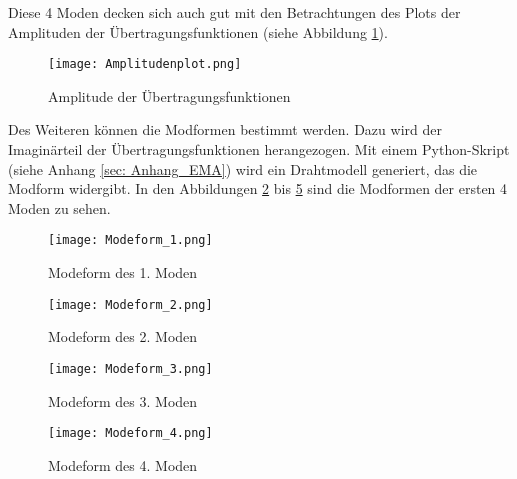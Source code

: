    \noindent
    Diese 4 Moden decken sich auch gut mit den Betrachtungen des Plots der
    Amplituden der Übertragungsfunktionen (siehe Abbildung
    \ref{fig: Amplitudenplot}).

    \begin{figure}[H]
        \centering
        \texttt{[image: Amplitudenplot.png]}
        \caption{Amplitude der Übertragungsfunktionen}
        \label{fig: Amplitudenplot}
    \end{figure}

    \noindent
    Des Weiteren können die Modformen bestimmt werden. Dazu wird der
    Imaginärteil der Übertragungsfunktionen herangezogen. Mit einem
    Python-Skript (siehe Anhang \ref{sec: Anhang_EMA}) wird ein Drahtmodell
    generiert, das die Modform widergibt. In den Abbildungen
    \ref{fig: Modeform_1} bis \ref{fig: Modeform_4} sind die Modformen
    der ersten 4 Moden zu sehen.

    \begin{figure}[H]
        \centering
        \texttt{[image: Modeform\_1.png]}
        \caption{Modeform des 1. Moden}
        \label{fig: Modeform_1}
    \end{figure}

    \begin{figure}[H]
        \centering
        \texttt{[image: Modeform\_2.png]}
        \caption{Modeform des 2. Moden}
        \label{fig: Modeform_2}
    \end{figure}

    \begin{figure}[H]
        \centering
        \texttt{[image: Modeform\_3.png]}
        \caption{Modeform des 3. Moden}
        \label{fig: Modeform_3}
    \end{figure}

    \begin{figure}[H]
        \centering
        \texttt{[image: Modeform\_4.png]}
        \caption{Modeform des 4. Moden}
        \label{fig: Modeform_4}
    \end{figure}

